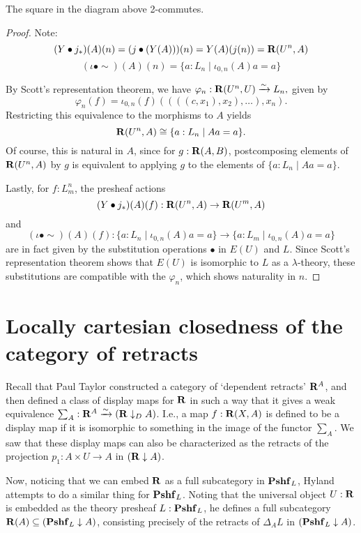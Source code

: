 \begin{lemma}
  The square in the diagram above 2-commutes.
\end{lemma}
\begin{proof}
  Note:
  \[ (Y \bullet j_*)(A)(n) = (j \bullet (Y(A)))(n) = Y(A)(j(n)) = \mathbf{R}(U^n, A) \]
  \[ (\iota \bullet \sim)(A)(n) = \{ a : L_n \mid \iota_{0, n}(A) a = a \} \]

  By Scott's representation theorem, we have $ \varphi_n: \mathbf{R}(U^n, U) \xrightarrow \sim L_n, $ given by
  \[ \varphi_n(f) = \iota_{0, n}(f) ((((c, x_1), x_2), \dots), x_n). \]
  Restricting this equivalence to the morphisms to $ A $ yields
  \[ \mathbf{R}(U^n, A) \cong \{ a : L_n \mid A a = a \}. \]
  Of course, this is natural in $ A $, since for $ g: \mathbf{R}(A, B) $, postcomposing elements of $ \mathbf{R}(U^n, A) $ by $ g $ is equivalent to applying $ g $ to the elements of $ \{ a : L_n \mid A a = a \} $.

  Lastly, for $ f : L_m^n $, the presheaf actions
  \[ (Y \bullet j_*)(A)(f) : \mathbf{R}(U^n, A) \to \mathbf{R}(U^m, A) \]
  and
  \[ (\iota \bullet \sim)(A)(f) : \{ a : L_n \mid \iota_{0, n}(A) a = a \} \to \{ a : L_m \mid \iota_{0, n}(A) a = a \} \]
  are in fact given by the substitution operations $ \bullet $ in $ E(U) $ and $ L $. Since Scott's representation theorem shows that $ E(U) $ is isomorphic to $ L $ as a $ \lambda $-theory, these substitutions are compatible with the $ \varphi_n $, which shows naturality in $ n $.
\end{proof}

\section{Locally cartesian closedness of the category of retracts}

Recall that Paul Taylor constructed a category of `dependent retracts' $ \mathbf{R}^A $, and then defined a class of display maps for $ \mathbf{R} $ in such a way that it gives a weak equivalence $ \sum_A : \mathbf{R}^A \xrightarrow{\sim} (\mathbf{R} \downarrow_D A) $. I.e., a map $ f: \mathbf{R}(X, A) $ is defined to be a display map if it is isomorphic to something in the image of the functor $ \sum_A $. We saw that these display maps can also be characterized as the retracts of the projection $ p_1: A \times U \to A $ in $ (\mathbf{R} \downarrow A) $.

Now, noticing that we can embed $ \mathbf{R} $ as a full subcategory in $ \mathbf{Pshf}_{L} $, Hyland attempts to do a similar thing for $ \mathbf{Pshf}_{L} $. Noting that the universal object $ U : \mathbf{R} $ is embedded as the theory presheaf $ L : \mathbf{Pshf}_{L} $, he defines a full subcategory $ \mathbf{R}(A) \subseteq (\mathbf{Pshf}_{L} \downarrow A) $, consisting precisely of the retracts of $ \Delta_A L $ in $ (\mathbf{Pshf}_{L} \downarrow A) $.

